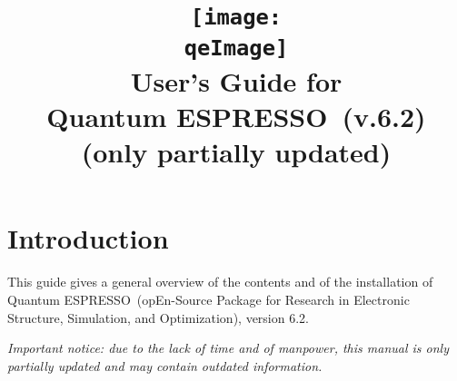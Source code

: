 \documentclass[12pt,a4paper]{article}
\def\version{6.2}
\def\qe{{\sc Quantum ESPRESSO}}
\begin{document}
\author{}
\date{}

\def\qeImage{quantum_espresso.pdf}

\title{
  \texttt{[image: \\qeImage]} \\
  \Huge User's Guide for \\ \qe\ (v.\version)
  \\ \Large (only partially updated)
}

\maketitle

\tableofcontents

\section{Introduction}

This guide gives a general overview of the contents and of the installation
of \qe\ (opEn-Source Package for Research in Electronic Structure, Simulation,
and Optimization), version \version.

{\em Important notice: due to the lack of time and of manpower, this
manual is only partially updated and may contain outdated information.}
\end{document}
